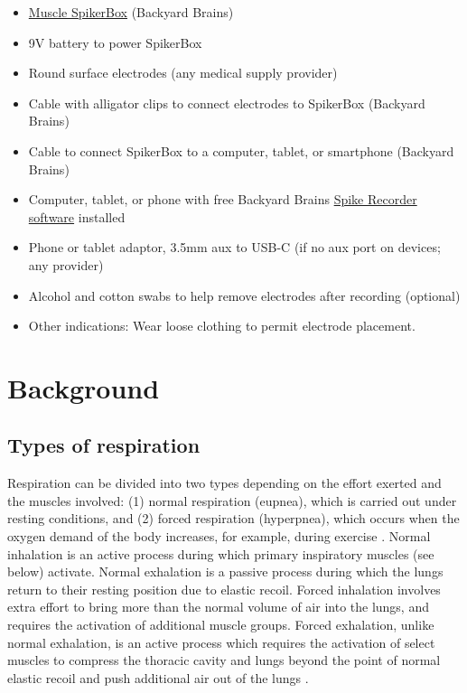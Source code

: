 \documentclass{article}
\begin{document}
\begin{itemize}
\item \href{https://backyardbrains.com/products/muscle-spikerbox}{Muscle SpikerBox} (Backyard Brains)
\item 9V battery to power SpikerBox
\item Round surface electrodes (any medical supply provider)
\item Cable with alligator clips to connect electrodes to SpikerBox (Backyard Brains)
\item Cable to connect SpikerBox to a computer, tablet, or smartphone (Backyard Brains)
\item Computer, tablet, or phone with free Backyard Brains \href{https://backyardbrains.com/products/byb-spike-recorder}{Spike Recorder software} installed
\item Phone or tablet adaptor, 3.5mm aux to USB-C (if no aux port on devices; any provider)
\item Alcohol and cotton swabs to help remove electrodes after recording (optional)
\item Other indications: Wear loose clothing to permit electrode placement.
\end{itemize}

\section{Background}

\subsection{Types of respiration}

Respiration can be divided into two types depending on the effort exerted and the muscles involved: (1) normal respiration (eupnea), which is carried out under resting conditions, and (2) forced respiration (hyperpnea), which occurs when the oxygen demand of the body increases, for example, during exercise \citep{openStax_breathing, whited2023respir} . Normal inhalation is an active process during which primary inspiratory muscles (see below) activate. Normal exhalation is a passive process during which the lungs return to their resting position due to elastic recoil. Forced inhalation involves extra effort to bring more than the normal volume of air into the lungs, and requires the activation of additional muscle groups. Forced exhalation, unlike normal exhalation, is an active process which requires the activation of select muscles to compress the thoracic cavity and lungs beyond the point of normal elastic recoil and push additional air out of the lungs \citep{openStax_breathing}.
\end{document}
